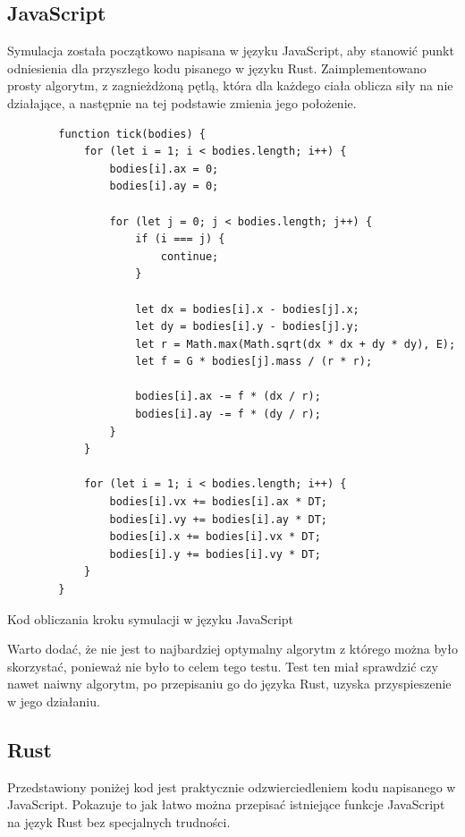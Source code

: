 \documentclass[language=polish,type=master]{aghmodern}
\begin{document}
\subsection{JavaScript}
Symulacja została początkowo napisana w języku JavaScript, aby stanowić punkt odniesienia dla przyszłego kodu pisanego w języku Rust.
Zaimplementowano prosty algorytm, z zagnieżdżoną pętlą, która dla każdego ciała oblicza siły na nie działające, a następnie na tej podstawie zmienia jego położenie.

\begin{listing}[H]
    \begin{verbatim}
        function tick(bodies) {
            for (let i = 1; i < bodies.length; i++) {
                bodies[i].ax = 0;
                bodies[i].ay = 0;

                for (let j = 0; j < bodies.length; j++) {
                    if (i === j) {
                        continue;
                    }

                    let dx = bodies[i].x - bodies[j].x;
                    let dy = bodies[i].y - bodies[j].y;
                    let r = Math.max(Math.sqrt(dx * dx + dy * dy), E);
                    let f = G * bodies[j].mass / (r * r);

                    bodies[i].ax -= f * (dx / r);
                    bodies[i].ay -= f * (dy / r);
                }
            }

            for (let i = 1; i < bodies.length; i++) {
                bodies[i].vx += bodies[i].ax * DT;
                bodies[i].vy += bodies[i].ay * DT;
                bodies[i].x += bodies[i].vx * DT;
                bodies[i].y += bodies[i].vy * DT;
            }
        }
    \end{verbatim}
    \caption{Kod obliczania kroku symulacji w języku JavaScript}
\end{listing}

Warto dodać, że nie jest to najbardziej optymalny algorytm z którego można było skorzystać, ponieważ nie było to celem tego testu.
Test ten miał sprawdzić czy nawet naiwny algorytm, po przepisaniu go do języka Rust, uzyska przyspieszenie w jego działaniu.

\subsection{Rust}
Przedstawiony poniżej kod jest praktycznie odzwierciedleniem kodu napisanego w JavaScript.
Pokazuje to jak łatwo można przepisać istniejące funkcje JavaScript na język Rust bez specjalnych trudności.
\end{document}
